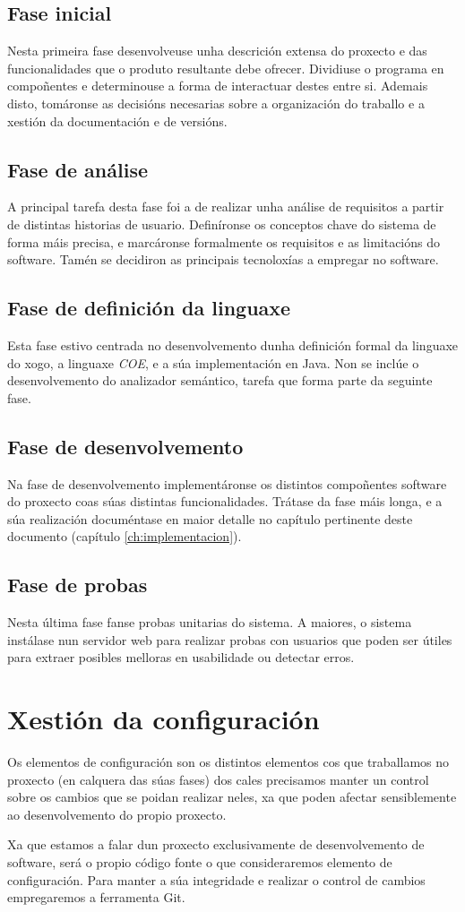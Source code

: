 \subsection{Fase inicial}
Nesta primeira fase desenvolveuse unha descrición extensa do proxecto e das
funcionalidades que o produto resultante debe ofrecer. Dividiuse o programa en
compoñentes e determinouse a forma de interactuar destes entre si. Ademais
disto, tomáronse as decisións necesarias sobre a organización do traballo e a
xestión da documentación e de versións.

\subsection{Fase de análise}
A principal tarefa desta fase foi a de realizar unha análise de requisitos a
partir de distintas historias de usuario. Definíronse os conceptos chave do
sistema de forma máis precisa, e marcáronse formalmente os requisitos e as
limitacións do software. Tamén se decidiron as principais tecnoloxías a
empregar no software.

\subsection{Fase de definición da linguaxe}
Esta fase estivo centrada no desenvolvemento dunha definición formal da linguaxe
do xogo, a linguaxe {\it COE}, e a súa implementación en Java. Non se inclúe o
desenvolvemento do analizador semántico, tarefa que forma parte da seguinte
fase.

\subsection{Fase de desenvolvemento}
Na fase de desenvolvemento implementáronse os distintos compoñentes software do
proxecto coas súas distintas funcionalidades. Trátase da fase máis longa, e a
súa realización documéntase en maior detalle no capítulo pertinente deste
documento (capítulo \ref{ch:implementacion}).

\subsection{Fase de probas}
Nesta última fase fanse probas unitarias do sistema. A maiores, o sistema
instálase nun servidor web para realizar probas con usuarios que poden ser
útiles para extraer posibles melloras en usabilidade ou detectar erros. 

\section{Xestión da configuración}
Os elementos de configuración son os distintos elementos cos que traballamos no
proxecto (en calquera das súas fases) dos cales precisamos manter un control
sobre os cambios que se poidan realizar neles, xa que poden afectar
sensiblemente ao desenvolvemento do propio proxecto.
\par
Xa que estamos a falar dun proxecto exclusivamente de desenvolvemento de
software, será o propio código fonte o que consideraremos elemento de
configuración. Para manter a súa integridade e realizar o control de cambios
empregaremos a ferramenta Git.

